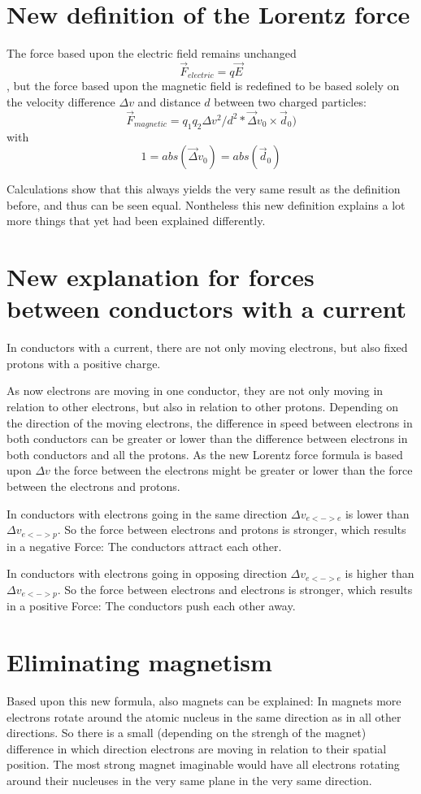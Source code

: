 \documentclass[12pt,a4paper,twocolumn]{article}
\begin{document}
\section{New definition of the Lorentz force}
The force based upon the electric field remains unchanged $$\vec{F}_{electric}=q\vec{E}$$, but the force based upon the magnetic field is redefined to be based solely on the velocity difference $\Delta v$ and distance $d$ between two charged particles: $$\vec{F}_{magnetic}=q_1 q_2 {\Delta v^2} / d^2 * {\vec\Delta v_0 \times \vec d_0)}$$  with $$1=abs(\vec \Delta v_0)=abs(\vec d_0)$$

Calculations show that this always yields the very same result as the definition before, and thus can be seen equal. Nontheless this new definition explains a lot more things that yet had been explained differently.

\section{New explanation for forces between conductors with a current}
In conductors with a current, there are not only moving electrons, but also fixed protons with a positive charge.

As now electrons are moving in one conductor, they are not only moving in relation to other electrons, but also in relation to other protons. Depending on the direction of the moving electrons, the difference in speed between electrons in both conductors can be greater or lower than the difference between electrons in both conductors and all the protons. As the new Lorentz force formula is based upon $\Delta v$ the force between the electrons might be greater or lower than the force between the electrons and protons.

In conductors with electrons going in the same direction $\Delta v_{e<->e}$ is lower than $\Delta v_{e<->p}$. So the force between electrons and protons is stronger, which results in a negative Force: The conductors attract each other.

In conductors with electrons going in opposing direction $\Delta v_{e<->e}$ is higher than $\Delta v_{e<->p}$. So the force between electrons and electrons is stronger, which results in a positive Force: The conductors push each other away.

\section{Eliminating magnetism}
Based upon this new formula, also magnets can be explained: In magnets more electrons rotate around the atomic nucleus in the same direction as in all other directions. So there is a small (depending on the strengh of the magnet) difference in which direction electrons are moving in relation to their spatial position. The most strong magnet imaginable would have all electrons rotating around their nucleuses in the very same plane in the very same direction.
\end{document}
